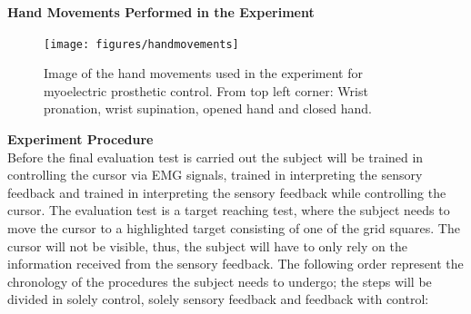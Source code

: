 \textbf{{\Large Hand Movements Performed in the Experiment}} \\

\begin{figure}[H]                 
	\texttt{[image: figures/handmovements]}
	\caption{Image of the hand movements used in the experiment for myoelectric prosthetic control. From top left corner: Wrist pronation, wrist supination, opened hand and closed hand.}
	\label{fig:handmovements} 
\end{figure}

\textbf{{\Large Experiment Procedure}} \\
\newline
Before the final evaluation test is carried out the subject will be trained in controlling the cursor via EMG signals, trained in interpreting the sensory feedback and trained in interpreting the sensory feedback while controlling the cursor. The evaluation test is a target reaching test, where the subject needs to move the cursor to a highlighted target consisting of one of the grid squares. The cursor will not be visible, thus, the subject will have to only rely on the information received from the sensory feedback. The following order represent the chronology of the procedures the subject needs to undergo; the steps will be divided in solely control, solely sensory feedback and feedback with control:


